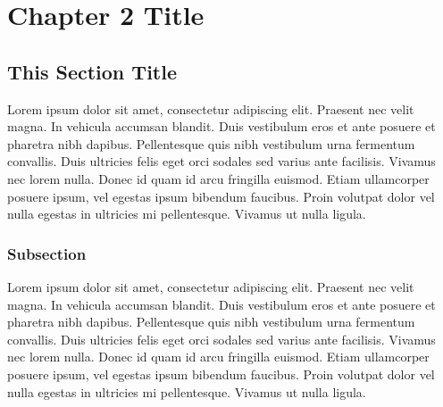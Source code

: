 \chapter{Chapter 2 Title}
\label{sec:chap2}
\thispagestyle{myheadings}

\section{This Section Title}
\label{sec:thissec}

Lorem ipsum dolor sit amet, consectetur adipiscing elit. Praesent nec velit magna. In vehicula accumsan blandit. Duis vestibulum eros et ante posuere et pharetra nibh dapibus. Pellentesque quis nibh vestibulum urna fermentum convallis. Duis ultricies felis eget orci sodales sed varius ante facilisis. Vivamus nec lorem nulla. Donec id quam id arcu fringilla euismod. Etiam ullamcorper posuere ipsum, vel egestas ipsum bibendum faucibus. Proin volutpat dolor vel nulla egestas in ultricies mi pellentesque. Vivamus ut nulla ligula. 


\subsection{Subsection}
\label{sec:subsec}

Lorem ipsum dolor sit amet, consectetur adipiscing elit. Praesent nec velit magna. In vehicula accumsan blandit. Duis vestibulum eros et ante posuere et pharetra nibh dapibus. Pellentesque quis nibh vestibulum urna fermentum convallis. Duis ultricies felis eget orci sodales sed varius ante facilisis. Vivamus nec lorem nulla. Donec id quam id arcu fringilla euismod. Etiam ullamcorper posuere ipsum, vel egestas ipsum bibendum faucibus. Proin volutpat dolor vel nulla egestas in ultricies mi pellentesque. Vivamus ut nulla ligula. 
